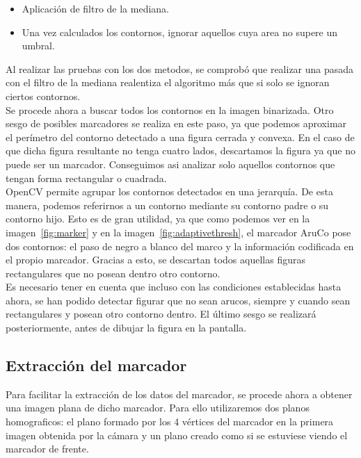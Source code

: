 \documentclass{article}
\begin{document}
\begin{itemize}
\item Aplicación de filtro de la mediana.
\item Una vez calculados los contornos, ignorar aquellos cuya area no supere un umbral.
\end{itemize}

Al realizar las pruebas con los dos metodos, se comprobó que realizar una pasada con el filtro de la mediana realentiza el algoritmo más que si solo se ignoran ciertos contornos.\\

Se procede ahora a buscar todos los contornos en la imagen binarizada. Otro sesgo de posibles marcadores se realiza en este paso, ya que podemos aproximar el perímetro del contorno detectado a una figura cerrada y convexa. En el caso de que dicha figura resultante no tenga cuatro lados, descartamos la figura ya que no puede ser un marcador. Conseguimos asi analizar solo aquellos contornos que tengan forma rectangular o cuadrada.\\
OpenCV permite agrupar los contornos detectados en una jerarquía. De esta manera, podemos referirnos a un contorno mediante su contorno padre o su contorno hijo.
Esto es de gran utilidad, ya que como podemos ver en la imagen~\ref{fig:marker} y en la imagen~\ref{fig:adaptivethresh}, el marcador AruCo pose dos contornos: el paso de negro a blanco del marco y la información codificada en el propio marcador. Gracias a esto, se descartan todos aquellas figuras rectangulares que no posean dentro otro contorno.\\
Es necesario tener en cuenta que incluso con las condiciones establecidas hasta ahora, se han podido detectar figurar que no sean arucos, siempre y cuando sean rectangulares y posean otro contorno dentro. El último sesgo se realizará posteriormente, antes de dibujar la figura en la pantalla.\\

\subsection{Extracción del marcador}
Para facilitar la extracción de los datos del marcador, se procede ahora a obtener una imagen plana de dicho marcador. Para ello utilizaremos dos planos homograficos: el plano formado por los 4 vértices del marcador en la primera imagen obtenida por la cámara y un plano creado como si se estuviese viendo el marcador de frente.\\
\end{document}
